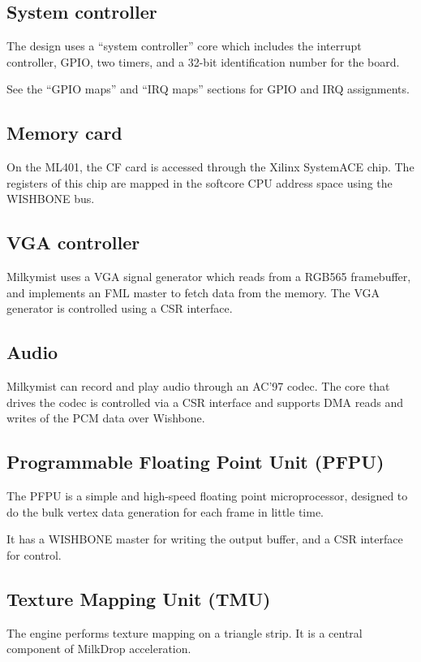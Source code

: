\documentclass[a4paper,11pt]{article}
\begin{document}
\subsection{System controller}
The design uses a ``system controller'' core which includes the interrupt controller, GPIO, two timers, and a 32-bit identification number for the board.

See the ``GPIO maps'' and ``IRQ maps'' sections for GPIO and IRQ assignments.

\subsection{Memory card}
On the ML401, the CF card is accessed through the Xilinx SystemACE chip. The registers of this chip are mapped in the softcore CPU address space using the WISHBONE bus.

\subsection{VGA controller}
Milkymist uses a VGA signal generator which reads from a RGB565 framebuffer, and implements an FML master to fetch data from the memory. The VGA generator is controlled using a CSR interface.

\subsection{Audio}
Milkymist can record and play audio through an AC'97 codec. The core that drives the codec is controlled via a CSR interface and supports DMA reads and writes of the PCM data over Wishbone.

\subsection{Programmable Floating Point Unit (PFPU)}
The PFPU is a simple and high-speed floating point microprocessor, designed to do the bulk vertex data generation for each frame in little time.

It has a WISHBONE master for writing the output buffer, and a CSR interface for control.

\subsection{Texture Mapping Unit (TMU)}
The engine performs texture mapping on a triangle strip. It is a central component of MilkDrop acceleration.
\end{document}
